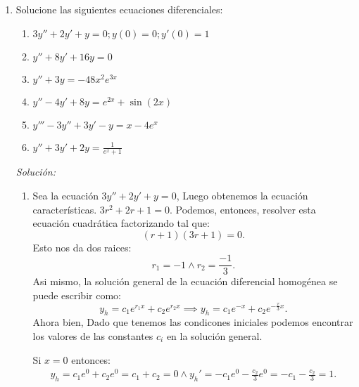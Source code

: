 


    

    \begin{enumerate}
      \item  Solucione las siguientes ecuaciones diferenciales:
	\begin{enumerate}
	  \item $3y''+2y'+y=0;y\left( 0 \right) = 0; y'\left( 0 \right) = 1$
	  \item $y'' + 8y' + 16y = 0$
	  \item $y'' + 3y = -48x^2e^{3x}$ 
	  \item $y''-4y'+8y=e^{2x}+\sin\left( 2x \right) $
	  \item $y'''-3y''+3y'-y=x-4e^{x}$
	  \item $y''+3y'+2y=\frac{1}{e^{x}+1}$
	\end{enumerate}
	\textit{Solución:}
	\begin{enumerate}
	  \item Sea la ecuación $3y''+2y'+y=0$, Luego obtenemos la ecuación características.  $3r^2+2r+1=0$.
	    Podemos, entonces, resolver esta ecuación cuadrática factorizando tal que: \[
	    \left( r+1 \right) \left( 3r+1 \right) =0
	    .\] Esto nos da dos raices: \[
	    r_1 = -1 \land r_2 = \frac{-1}{3}
	    .\] Asi mismo, la solución general de la ecuación diferencial homogénea se puede escribir como: \[
	    y_h = c_1e^{r_1x}+c_2e^{r_2x}\implies y_h = c_1e^{-x}+c_2e^{-\frac{x}{3}x}
	    .\] Ahora bien, Dado que tenemos las condicones iniciales podemos encontrar los valores de las constantes $c_i$ en la solución general.

	    Si  $x=0$ entonces:
	     \begin{align*}
	      y_h =c_1e^{0}+c_2e^{0}=c_1+c_2=0 \land y_h' = -c_1e^{0}-\frac{c_2}{3}e^{0}=-c_1-\frac{c_2}{3}=1
	    .\end{align*}


\end{enumerate}
\end{enumerate}
